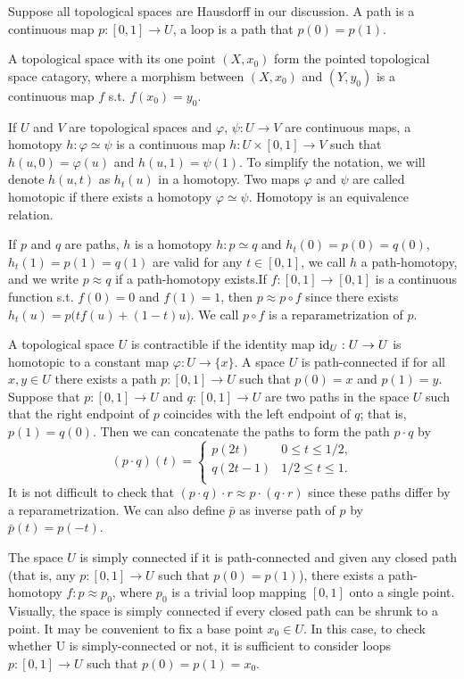 \documentclass[10pt]{article}
\theoremstyle{plain}
\begin{document}
Suppose all topological spaces are Hausdorff in our discussion. A path is a continuous map $p:[0,1]\to U$, a loop is a path that $p(0)=p(1)$.

A topological space with its one point $(X,x_0)$ form the pointed topological space catagory, where a morphism between $(X,x_0)$ and $(Y,y_0)$ is a continuous map $f$ s.t. $f(x_0)=y_0$.

If $U$ and $V$ are topological spaces and $\varphi$, $\psi:U\to V$ are continuous maps, a homotopy $h : \varphi \simeq\psi$ is a continuous map $h : U × [0,1] \to V$ such that $h(u,0) = \varphi(u)$ and $h(u,1) = \psi(1)$. To simplify the notation, we will denote
$h(u, t)$ as $h_t(u)$ in a homotopy. Two maps $\varphi$ and $\psi$ are called homotopic if there exists a homotopy $\varphi \simeq\psi$. Homotopy is an equivalence relation.

If $p$ and $q$ are paths, $h$ is a homotopy $h: p \simeq q$ and $h_t(0)=p(0)=q(0)$, $h_t(1)=p(1)=q(1)$ are valid for any $t\in[0,1]$, we call $h$ a path-homotopy, and we write $p \approx q$ if a path-homotopy exists.If $f:[0,1]\to[0,1]$ is a continuous function s.t. $f(0)=0$ and $f(1)=1$, then $p\approx p\circ f$ since there exists $h_t(u)=p\bigl(tf(u)+(1-t)u\bigr)$. We call $p\circ f$ is a reparametrization of $p$.

A topological space $U$ is contractible if the identity map $\operatorname{id}_U:U\to U$ is homotopic to a constant map $\varphi:U\to \{x\}$. A space
$U$ is path-connected if for all $x, y \in U$ there exists a path $p : [0,1] \to U$ such that $p(0) = x$ and $p(1) = y$.
Suppose that $p : [0,1] \to U$ and $q : [0,1] \to U$ are two paths in the space $U$ such that the right endpoint of $p$ coincides with the left endpoint of $q$; that is, $p(1) = q(0)$. Then we can concatenate the paths to form the path $p\cdot q$ by
\[
	(p\cdot q)(t)=
	\begin{cases}
		p(2t) &0 \leq t\leq 1/2,\\
		q(2t-1)&1/2 \leq t\leq 1.\\
	\end{cases}
\]
It is not difficult to check that $(p\cdot q)\cdot r \approx p\cdot (q\cdot r)$ since these paths differ by a reparametrization. We can also define $\bar{p}$ as inverse path of $p$ by $\bar{p}(t)=p(-t)$.

The space $U$ is simply connected if it is path-connected and given any
closed path (that is, any $p : [0,1] \to U$ such that $p(0) = p(1)$), there exists a path-homotopy $f : p \approx p_0$, where $p_0$ is a trivial loop mapping $[0,1]$ onto a single point. Visually, the space is simply connected if every closed path can be shrunk to a point. It may be convenient to fix a base point $x_0 \in U$. In this case, to check whether U is simply-connected or not, it is sufficient to consider
loops $p : [0,1] \to U$ such that $p(0) = p(1) = x_0$.
\end{document}
